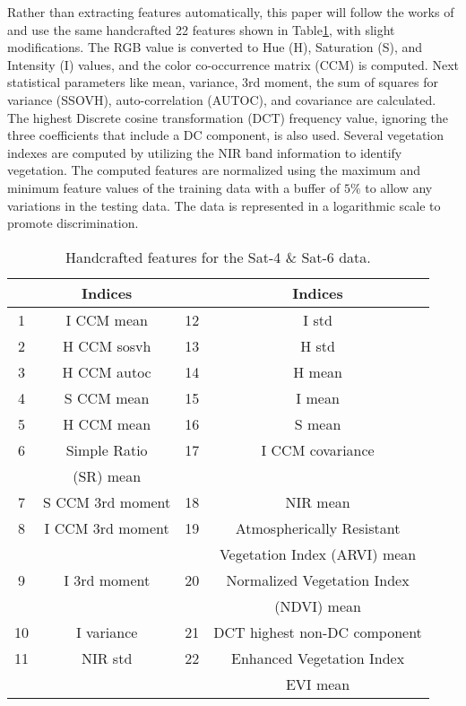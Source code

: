 Rather than extracting features automatically, this paper will follow the works of\cite{Basu2015, Liu2020} and use the same handcrafted 22 features shown in Table\ref{table: Features}, with slight modifications. The RGB value is converted to Hue (H), Saturation (S), and Intensity (I) values, and the color co-occurrence matrix (CCM) is computed\cite{Boyda2017}. Next statistical parameters like mean, variance, 3rd moment, the sum of squares for variance (SSOVH), auto-correlation (AUTOC), and covariance are calculated. The highest Discrete cosine transformation (DCT) frequency value, ignoring the three coefficients that include a DC component, is also used. Several vegetation indexes are computed by utilizing the NIR band information to identify vegetation. The computed features are normalized using the maximum and minimum feature values of the training data with a  buffer of  $5\%$ to allow any variations in the testing data. The data is represented in a logarithmic scale to promote discrimination.
\begin{table}[tbp]
    \caption{Handcrafted features for the Sat-4 \& Sat-6 data.}
    \label{table: Features}
    \centering
    \begin{tabular}{|c|c|c|c|}
        \hline
        \textbf{} & \textbf{Indices} & \textbf{} & \textbf{Indices}\\
        \hline
        1 & I CCM mean & 12 & I std \\
        \hline
        2 & H CCM sosvh & 13 & H std \\
        \hline
        3 & H CCM autoc & 14 & H mean \\
        \hline
        4 & S CCM mean & 15 & I mean \\
        \hline
        5 & H CCM mean & 16 & S mean \\
        \hline
        6 & Simple Ratio & 17 & I CCM covariance \\
        & (SR) mean & & \\
        \hline
        7 & S CCM 3rd moment & 18 & NIR mean \\
        \hline
        8 & I CCM 3rd moment & 19 & Atmospherically Resistant  \\
        & & & Vegetation Index (ARVI) mean\\
        \hline
        9 & I 3rd moment & 20 & Normalized Vegetation Index \\
        & & & (NDVI) mean\\
        \hline
        10 & I variance & 21 & DCT highest non-DC component\\
        \hline
        11 & NIR std & 22 & Enhanced Vegetation Index \\
        & & &EVI mean\\
        \hline
    \end{tabular}
\end{table}

